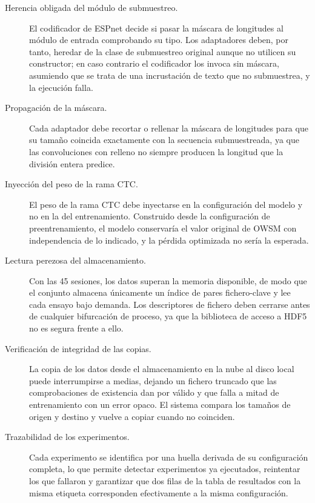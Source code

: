 \begin{description}
  \item[Herencia obligada del módulo de submuestreo.] El codificador de ESPnet decide si pasar la máscara de longitudes al módulo de entrada comprobando su tipo. Los adaptadores deben, por tanto, heredar de la clase de submuestreo original aunque no utilicen su constructor; en caso contrario el codificador los invoca sin máscara, asumiendo que se trata de una incrustación de texto que no submuestrea, y la ejecución falla.
  \item[Propagación de la máscara.] Cada adaptador debe recortar o rellenar la máscara de longitudes para que su tamaño coincida exactamente con la secuencia submuestreada, ya que las convoluciones con relleno no siempre producen la longitud que la división entera predice.
  \item[Inyección del peso de la rama CTC.] El peso de la rama CTC debe inyectarse en la configuración del modelo y no en la del entrenamiento. Construido desde la configuración de preentrenamiento, el modelo conservaría el valor original de OWSM con independencia de lo indicado, y la pérdida optimizada no sería la esperada.
  \item[Lectura perezosa del almacenamiento.] Con las 45 sesiones, los datos superan la memoria disponible, de modo que el conjunto almacena únicamente un índice de pares fichero-clave y lee cada ensayo bajo demanda. Los descriptores de fichero deben cerrarse antes de cualquier bifurcación de proceso, ya que la biblioteca de acceso a HDF5 no es segura frente a ello.
  \item[Verificación de integridad de las copias.] La copia de los datos desde el almacenamiento en la nube al disco local puede interrumpirse a medias, dejando un fichero truncado que las comprobaciones de existencia dan por válido y que falla a mitad de entrenamiento con un error opaco. El sistema compara los tamaños de origen y destino y vuelve a copiar cuando no coinciden.
  \item[Trazabilidad de los experimentos.] Cada experimento se identifica por una huella derivada de su configuración completa, lo que permite detectar experimentos ya ejecutados, reintentar los que fallaron y garantizar que dos filas de la tabla de resultados con la misma etiqueta corresponden efectivamente a la misma configuración.
\end{description}
